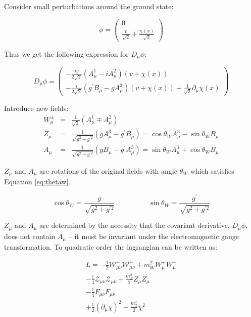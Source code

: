 Consider small perturbations around the ground state:

\begin{equation}
\phi = \left(
\begin{array}{c}
0 \\ 
\frac{v}{\sqrt{2}} + \frac{\chi(x)}{\sqrt{2}}
\end{array}
\right)
\end{equation}

Thus we get the following expression for $D_{\mu}\phi$:

\begin{equation}
D_{\mu}\phi = \left(
\begin{array}{c}
-\frac{ig}{2\sqrt{2}}\left(A_{\mu}^{1} - iA_{\mu}^{2}\right)(v + \chi(x)) \\
-\frac{i}{2\sqrt{2}}\left(g^{\prime}B_{\mu} - gA_{\mu}^{3}\right)(v + \chi(x)) +
\frac{1}{\sqrt{2}}\partial_{\mu}\chi(x)
\end{array}
\right)
\end{equation}

Introduce new fields:
\begin{eqnarray}
W_{\mu}^{\pm} &=& \frac{1}{\sqrt{2}}(A_{\mu}^{1} \mp A_{\mu}^{2}) \\
Z_{\mu} &=& \frac{1}{\sqrt{g^{2} + g^{\prime 2}}}(gA_{\mu}^{3} -
g^{\prime}B_{\mu}) = \cos\theta_{W}A_{\mu}^{3} - \sin\theta_{W}B_{\mu} \\
A_{\mu} &=& \frac{1}{\sqrt{g^{2} + g^{\prime 2}}}(gB_{\mu} -
g^{\prime}A_{\mu}^{3}) = \sin\theta_{W}A_{\mu}^{3} + \cos\theta_{W}B_{\mu}
\end{eqnarray}

$Z_{\mu}$ and $A_{\mu}$ are rotations of the original fields with angle
$\theta_{W}$ which satisfies Equation \ref{eq:thetaw}.

\begin{equation}
\cos\theta_{W} = \frac{g}{\sqrt{g^{2} + g^{\prime 2}}} \hspace{2cm}
\sin\theta_{W} = \frac{g^{\prime}}{\sqrt{g^{2} + g^{\prime 2}}}
\label{eq:thetaw}
\end{equation}

$Z_{\mu}$ and $A_{\mu}$ are determined by the necessity that the covariant
derivative, $D_{\mu}\phi$, does not contain $A_{\mu}$ -- it must be invariant
under the electromagnetic gauge transformation. To quadratic order the
lagrangian can be written as:  

\begin{eqnarray}
L = -\frac{1}{2}\mathcal{W}_{\mu\nu}^{+}\mathcal{W}_{\mu\nu}^{-} + 
m_{W}^{2}W_{\mu}^{+}W_{\mu}^{-} \\
-\frac{1}{4}\mathcal{Z}_{\mu\nu}\mathcal{Z}_{\mu\nu} + 
\frac{m_{Z}^{2}}{2}Z_{\mu}Z_{\mu} \\
-\frac{1}{4}F_{\mu\nu}F_{\mu\nu} \\
+\frac{1}{2}(\partial_{\mu}\chi)^{2} - \frac{m_{\chi}^{2}}{2}\chi^{2}
\end{eqnarray}

